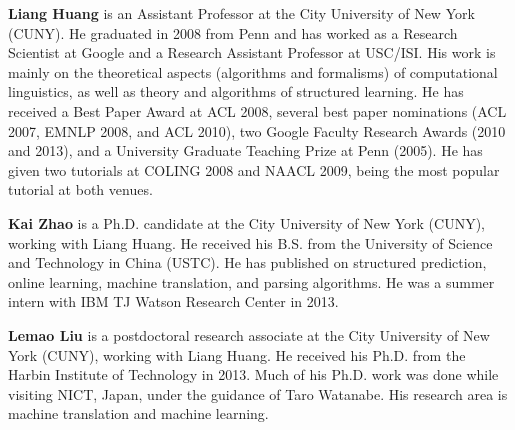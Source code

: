 \begin{bio}
{\bfseries Liang Huang} is an Assistant Professor at the City University of New York (CUNY). He graduated in 2008 from Penn and has worked as a Research Scientist at Google and a Research Assistant Professor at USC/ISI. His work is mainly on the theoretical aspects (algorithms and formalisms) of computational linguistics, as well as theory and algorithms of structured learning. He has received a Best Paper Award at ACL 2008, several best paper nominations (ACL 2007, EMNLP 2008, and ACL 2010), two Google Faculty Research Awards (2010 and 2013), and a University Graduate Teaching Prize at Penn (2005). He has given two tutorials at COLING 2008 and NAACL 2009, being the most popular tutorial at both venues.

{\bfseries Kai Zhao} is a Ph.D. candidate at the City University of New York (CUNY), working with Liang Huang. He received his B.S. from the University of Science and Technology in China (USTC). He has published on structured prediction, online learning, machine translation, and parsing algorithms. He was a summer intern with IBM TJ Watson Research Center in 2013.

{\bfseries Lemao Liu} is a postdoctoral research associate at the City University of New York (CUNY), working with Liang Huang. He received his Ph.D. from the Harbin Institute of Technology in 2013. Much of his Ph.D. work was done while visiting NICT, Japan, under the guidance of Taro Watanabe. His research area is machine translation and machine learning.
\end{bio}

